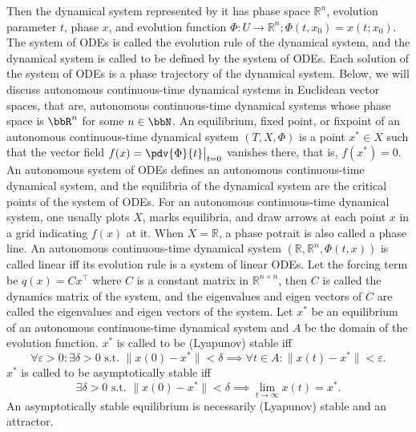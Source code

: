 \documentclass[a4paper,12pt]{report}
\begin{document}
Then the dynamical system represented by it has phase space $\mathbb{R}^n$, evolution parameter $t$, phase $x$, and evolution function $\Phi\colon U\to\mathbb{R}^n;\Phi(t,x_0)=x(t;x_0)$. The system of ODEs is called the evolution rule of the dynamical system, and the dynamical system is called to be defined by the system of ODEs. Each solution of the system of ODEs is a phase trajectory of the dynamical system.
Below, we will discuss autonomous continuous-time dynamical systems in Euclidean vector spaces, that are, autonomous continuous-time dynamical systems whose phase space is $\bbR^n$ for some $n\in\bbN$.
An equilibrium, fixed point, or fixpoint of an autonomous continuous-time dynamical system $(T, X, \Phi)$ is a point $x^*\in X$ such that the vector field $f(x)=\pdv{\Phi}{t}\big\vert_{t=0}$ vanishes there, that is, $f(x^*)=0$.
An autonomous system of ODEs defines an autonomous continuous-time dynamical system, and the equilibria of the dynamical system are the critical points of the system of ODEs.
For an autonomous continuous-time dynamical system, one usually plots $X$, marks equilibria, and draw arrows at each point $x$ in a grid indicating $f(x)$ at it. When $X=\mathbb{R}$, a phase potrait is also called a phase line.
An autonomous continuous-time dynamical system $(\mathbb{R}, \mathbb{R}^n, \Phi(t,x))$ is called linear iff its evolution rule is a system of linear ODEs. Let the forcing term be $q(x)=Cx^\top$ where $C$ is a constant matrix in $\mathbb{R}^{n\times n}$, then $C$ is called the dynamics matrix of the system, and the eigenvalues and eigen vectors of $C$ are called the eigenvalues and eigen vectors of the system.
Let $x^*$ be an equilibrium of an autonomous continuous-time dynamical system and $A$ be the domain of the evolution function.
$x^*$ is called to be (Lyapunov) stable iff
\[\forall\varepsilon>0\colon\exists\delta>0\text{\ s.t.\ }\|x(0)-x^*\|<\delta\implies\forall t\in A\colon\|x(t)-x^*\|<\varepsilon.\]
$x^*$ is called to be asymptotically stable iff
\[\exists\delta>0\text{\ s.t.\ }\|x(0)-x^*\|<\delta\implies\lim_{t\to\infty}x(t)=x^*.\]
An asymptotically stable equilibrium is necessarily (Lyapunov) stable and an attractor.
\end{document}
